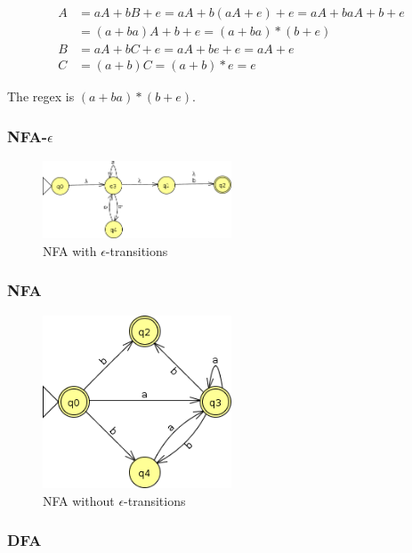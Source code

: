 \documentclass[10pt,a4paper]{article}
\begin{document}
\begin{align*}
  A & = aA + bB + e = aA + b(aA + e) + e = aA + baA + b + e\\
  & = (a + ba)A + b + e = (a + ba)* (b + e)\\
  B & = aA + bC + e = aA + be + e = aA + e\\
  C & = (a + b)C = (a + b)*e = e
\end{align*}

The regex is $(a + ba)* (b + e)$.

\subsubsection*{NFA-$\epsilon$}

\begin{figure}[h]
  \centering
  \includegraphics[width=0.5\textwidth]{sheet-1/exercise-3-a-nfa-e}
  \caption{NFA with $\epsilon$-transitions}
\end{figure}

\subsubsection*{NFA}

\begin{figure}[h]
  \centering
  \includegraphics[width=0.5\textwidth]{sheet-1/exercise-3-a-nfa}
  \caption{NFA without $\epsilon$-transitions}
\end{figure}

\subsubsection*{DFA}
\end{document}
